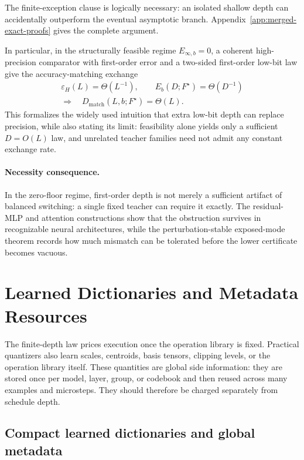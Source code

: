 \documentclass[twoside,11pt]{article}
\begin{document}
The finite-exception clause is logically necessary: an isolated shallow depth
can accidentally outperform the eventual asymptotic branch.  Appendix~\ref{app:merged-exact-proofs} gives the complete argument.

In particular, in the structurally feasible regime $E_{\infty,b}=0$, a coherent
high-precision comparator with first-order error and a two-sided first-order
low-bit law give the accuracy-matching exchange
\begin{equation}
\boxed{\begin{gathered}
\varepsilon_H(L)=\Theta(L^{-1}),\qquad
E_b(D;F^\star)=\Theta(D^{-1})\\
\Longrightarrow\quad D_{\mathrm{match}}(L,b;F^\star)=\Theta(L).
\end{gathered}}
\label{eq:linear-matching-law-main}
\end{equation}
This formalizes the widely used intuition that extra low-bit depth can replace
precision, while also stating its limit: feasibility alone yields only a
sufficient $D=O(L)$ law, and unrelated teacher families need not admit any
constant exchange rate.

\paragraph{Necessity consequence.}
In the zero-floor regime, first-order depth is not merely a sufficient artifact
of balanced switching: a single fixed teacher can require it exactly.  The
residual-MLP and attention constructions show that the obstruction survives in
recognizable neural architectures, while the perturbation-stable exposed-mode
theorem records how much mismatch can be tolerated before the lower certificate
becomes vacuous.


\section{Learned Dictionaries and Metadata Resources}
\label{sec:learned-dictionaries-main-section}

The finite-depth law prices execution once the operation library is fixed.
Practical quantizers also learn scales, centroids, basis tensors, clipping
levels, or the operation library itself.  These quantities are global side
information: they are stored once per model, layer, group, or codebook and then
reused across many examples and microsteps.  They should therefore be charged
separately from schedule depth.

\subsection{Compact learned dictionaries and global metadata}
\label{sec:learned-dictionaries-main}
\end{document}
